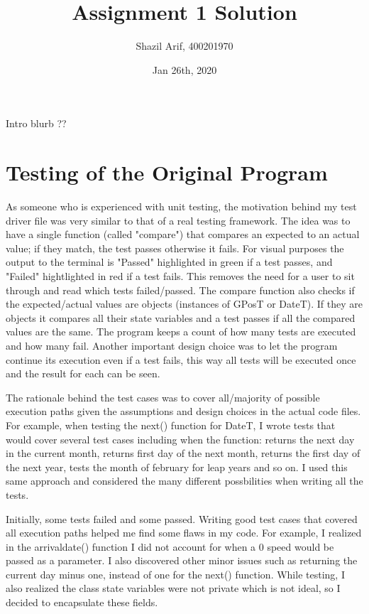 \documentclass[12pt]{article}
\title{Assignment 1 Solution}
\author{Shazil Arif, 400201970}
\date{Jan 26th, 2020}
\begin{document}
\maketitle

Intro blurb ??

\section{Testing of the Original Program}

As someone who is experienced with unit testing, the motivation behind my test driver file was very similar to that of a real testing framework. The idea was to have a single function (called "compare") that compares an expected to 
an actual value; if they match, the test passes otherwise it fails. For visual purposes the output to the terminal is "Passed" highlighted in green if a test passes, and "Failed" hightlighted in red if a test fails. This removes the need for a user to sit through and read which tests failed/passed. The compare function also checks if the expected/actual values are objects (instances of GPosT or DateT). If they are objects it compares all their state variables and a test passes if all the compared values are the same. The program keeps a count of how many tests are executed and how many fail. Another important design choice was to let the program continue its execution even if a test fails, this way all tests will be executed once and the result for each can be seen.

The rationale behind the test cases was to cover all/majority of possible execution paths given the assumptions and design choices in the actual code files. For example, when testing the next() function for DateT, I wrote tests that would cover several test cases including when the function: returns the next day in the current month, returns first day of the next month, returns the first day of the next year, tests the month of february for leap years and so on. I used this same approach and considered the many different possbilities when writing all the tests. 

Initially, some tests failed and some passed. Writing good test cases that covered all execution paths helped me find some flaws in my code. For example, I realized in the arrivaldate() function I did not account for when a 0 speed would be passed as a parameter. I also discovered other minor issues such as returning the current day minus one, instead of one for the next() function. While testing, I also realized the class state variables were not private which is not ideal, so I decided to encapsulate these fields.
\end{document}
